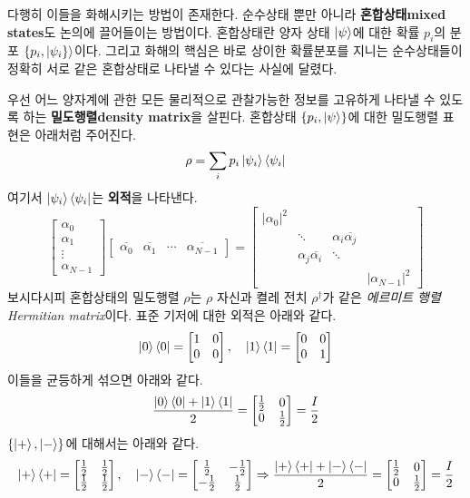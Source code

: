 \documentclass[a4paper,chapter,atbegshi]{oblivoir}
\begin{document}
다행히 이들을 화해시키는 방법이 존재한다. 순수상태 뿐만 아니라 
\textbf{혼합상태\tiny mixed states}도 논의에 끌어들이는 방법이다. 혼합상태란
양자 상태 $\ket{\psi}$에 대한 확률 $p_i$의 분포 $\{p_i,\ket{\psi_i\}}$이다.
그리고 화해의 핵심은 바로 상이한 확률분포를 지니는 순수상태들이 정확히
서로 같은 혼합상태로 나타낼 수 있다는 사실에 달렸다. 

우선 어느 양자계에 관한 모든 물리적으로 관찰가능한 정보를 고유하게 나타낼 수
있도록 하는 \textbf{밀도행렬\tiny density matrix}을 살핀다. 혼합상태 
$\{p_i,\ket{\psi}\}$에 대한 밀도행렬 표현은 아래처럼 주어진다. 
\begin{equation}
  \rho = \sum_i p_i\ket{\psi_i}\bra{\psi_i}
\end{equation}
여기서 $\ket{\psi_i}\bra{\psi_i}$는 \textbf{외적}을 나타낸다.
\[
  \begin{bmatrix}\alpha_0\\\alpha_1\\\vdots\\\alpha_{N-1}\end{bmatrix}
  \begin{bmatrix}\overline{\alpha_0} & \overline{\alpha_1} &\cdots 
  &\overline{\alpha_{N-1}}\end{bmatrix} = \begin{bmatrix}
    |\alpha_0|^2 & & &  \\
    & \ddots & \alpha_i\overline{\alpha_j}& \\
    &\alpha_j\overline{\alpha_i}&\ddots&\\
    &&&|\alpha_{N-1}|^2
  \end{bmatrix}
\]
보시다시피 혼합상태의 밀도행렬 $\rho$는 $\rho$ 자신과 켤레 전치 $\rho^{\dagger}$가
같은 \emph{에르미트 행렬\tiny Hermitian matrix}이다. 표준 기저에 
대한 외적은 아래와 같다.
\[
  \ket0\bra0=\begin{bmatrix}1&0\\0&0\end{bmatrix},\quad
  \ket1\bra1=\begin{bmatrix}0&0\\0&1\end{bmatrix}
\]
이들을 균등하게 섞으면 아래와 같다.
\[
  \frac{\ket0\bra0+\ket1\bra1}{2} =
  \begin{bmatrix}\frac{1}{2}&0\\0&\frac{1}{2}\end{bmatrix}
  =\frac{I}{2}
\]
$\{\ket+,\ket-\}$에 대해서는 아래와 같다.
\[
  \ket+\bra+=\begin{bmatrix}\frac{1}{2}&\frac{1}{2}\\\frac{1}{2}&\frac{1}{2}\end{bmatrix},\quad
  \ket-\bra-=\begin{bmatrix}\frac{1}{2}&-\frac{1}{2}\\-\frac{1}{2}&\frac{1}{2}\end{bmatrix}
  \Rightarrow\frac{\ket+\bra++\ket-\bra-}{2}=\begin{bmatrix}\frac{1}{2}&0\\0&\frac{1}{2}\end{bmatrix}=\frac{I}{2}
\]
\end{document}
